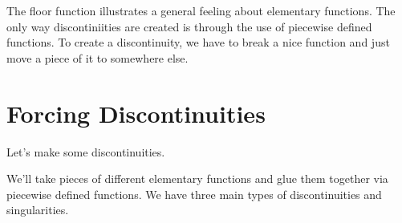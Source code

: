 \documentclass{ximera}
\begin{document}
The floor function illustrates a general feeling about elementary functions. The only way discontiniities are created is through the use of piecewise defined functions.  To create a discontinuity, we have to break a nice function and just move a piece of it to somewhere else.











\section{Forcing Discontinuities}



Let's make some discontinuities.

We'll take pieces of different elementary functions and glue them together via piecewise defined functions. We have three main types of discontinuities and singularities.
\end{document}
